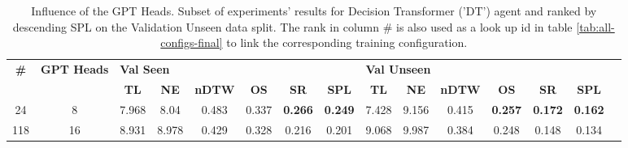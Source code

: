 \begin{table}
\centering
\caption{\label{tab:dt_heads}Influence of the GPT Heads. Subset of experiments' results for Decision Transformer ('DT') agent and ranked by descending SPL on the Validation Unseen data split. The rank in column \# is also used as a look up id in table \ref{tab:all-configs-final} to link the corresponding training configuration.}
\begin{tabular}{@{\hskip3pt}c@{\hskip3pt}c@{\hskip3pt}c@{\hskip3pt}c@{\hskip3pt}c@{\hskip3pt}c@{\hskip3pt}c@{\hskip3pt}c@{\hskip3pt}c@{\hskip3pt}c@{\hskip3pt}c@{\hskip3pt}c@{\hskip3pt}c@{\hskip3pt}c@{\hskip3pt}c}
\toprule
\textbf{\#} & \textbf{GPT Heads} & \multicolumn{6}{l}{\textbf{Val Seen}} & \multicolumn{6}{l}{\textbf{Val Unseen}} \\
 \textbf{~} &         \textbf{~} &       \textbf{TL} & \textbf{NE} & \textbf{nDTW} & \textbf{OS} &     \textbf{SR} &    \textbf{SPL} &         \textbf{TL} & \textbf{NE} & \textbf{nDTW} &     \textbf{OS} &     \textbf{SR} &    \textbf{SPL} \\
\midrule
         24 &                  8 &             7.968 &        8.04 &         0.483 &       0.337 &  \textbf{0.266} &  \textbf{0.249} &               7.428 &       9.156 &         0.415 &  \textbf{0.257} &  \textbf{0.172} &  \textbf{0.162} \\
        118 &                 16 &             8.931 &       8.978 &         0.429 &       0.328 &           0.216 &           0.201 &               9.068 &       9.987 &         0.384 &           0.248 &           0.148 &           0.134 \\
\bottomrule
\end{tabular}
\end{table}
